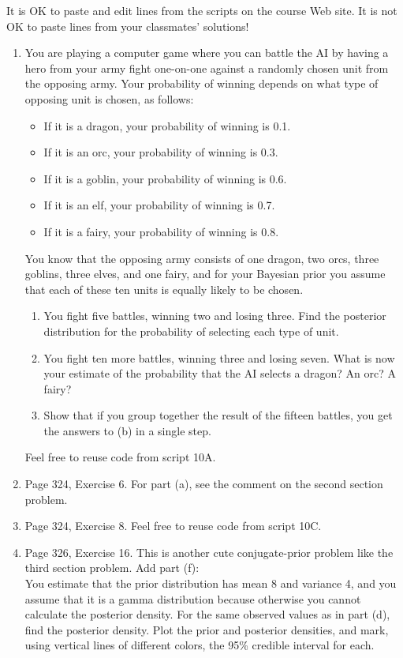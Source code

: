 \documentclass[12pt]{article}
\begin{document}
It is OK to paste and edit lines from the scripts on the course Web site. It is not OK to paste lines from your classmates' solutions!

\begin{enumerate}
\item You are playing a computer game where you can battle the AI by having a hero from your army fight one-on-one against a randomly chosen unit from the opposing army. Your probability of winning depends on what type of opposing unit is chosen, as follows:

\begin{itemize}
\item If it is a dragon, your probability of winning is 0.1.
\item If it is an orc, your probability of winning is 0.3.
\item If it is a goblin, your probability of winning is 0.6.
\item If it is an elf, your probability of winning is 0.7.
\item If it is a fairy, your probability of winning is 0.8.
\end{itemize}

You know that the opposing army consists of one dragon, two orcs, three goblins, three elves, and one fairy, and for your Bayesian prior you assume that each of these ten units is equally likely to be chosen.

\begin{enumerate}
\item You fight five battles, winning two and losing three. Find the posterior distribution for the probability of selecting each type of unit.
\item You fight ten more battles, winning three and losing seven. What is now your estimate of the probability that the AI selects a dragon? An orc? A fairy?
\item Show that if you group together the result of the fifteen battles, you get the answers to (b) in a single step.
\end{enumerate}

Feel free to reuse code from script 10A.

\item Page 324, Exercise 6. For part (a), see the comment on the second section problem.

\item Page 324, Exercise 8. Feel free to reuse code from script 10C.

\item Page 326, Exercise 16. This is another cute conjugate-prior problem like the third section problem. Add part (f):\\
You estimate that the prior distribution has mean 8 and variance 4, and you assume that it is a gamma distribution because otherwise you cannot calculate the posterior density. For the same observed values as in part (d), find the posterior density. Plot the prior and posterior densities, and mark, using vertical lines of different colors, the 95\% credible interval for each.


\end{enumerate}
\end{document}
